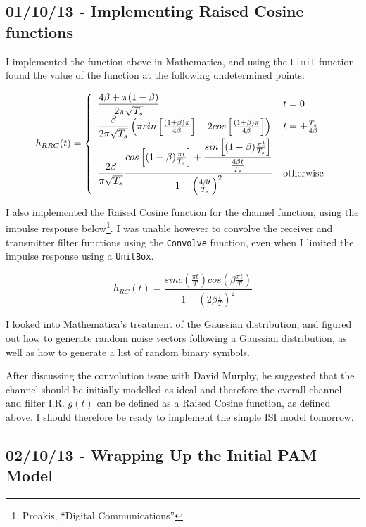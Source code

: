 \subsection{01/10/13 - Implementing Raised Cosine functions}

I implemented the function above in Mathematica, and using the
\texttt{Limit} function found the value of the function at the following
undetermined points:

\[
h_{RRC}(t) = \left\{
  \begin{array}{l l}
    \dfrac{4 \beta + \pi (1 - \beta)}{2 \pi \sqrt{T_s}} & t = 0 \\
    \dfrac{\beta}{2 \pi \sqrt{T_s}} \left ( \pi sin \left [ \frac{(1 + \beta) \pi}{4 \beta} \right ] - 2 cos \left [ \frac{(1 + \beta) \pi}{4 \beta} \right ] \right ) & t = \pm \frac{T_s}{ 4 \beta } \\
    \dfrac{2 \beta}{\pi \sqrt{T_s}} \dfrac{cos \left [ (1 + \beta) \frac{\pi t}{T_s} \right ] + \dfrac{sin \left [ (1 - \beta) \frac{\pi t}{T_s} \right ]}{\frac{4 \beta t}{T_s}}}{1 - \left ( \frac{4 \beta t}{T_s} \right )^2} & \text{otherwise}
  \end{array}\right.
\]

I also implemented the Raised Cosine function for the channel function,
using the impulse response below\footnote{Proakis, ``Digital
  Communications''}. I was unable however to convolve the receiver and
transmitter filter functions using the \texttt{Convolve} function, even
when I limited the impulse response using a \texttt{UnitBox}.

\[
h_{RC}(t) = \frac{sinc \left ( \frac{\pi t}{T} \right ) cos \left ( \beta \frac{\pi t}{T} \right )}{1 - \left ( 2 \beta \frac{t}{T} \right )^2}
\]

I looked into Mathematica's treatment of the Gaussian distribution, and
figured out how to generate random noise vectors following a Gaussian
distribution, as well as how to generate a list of random binary
symbols.

After discussing the convolution issue with David Murphy, he suggested that the
channel should be initially modelled as ideal and therefore the overall
channel and filter I.R. $g(t)$ can be defined as a Raised Cosine
function, as defined above. I should therefore be ready to implement the
simple ISI model tomorrow.

\subsection{02/10/13 - Wrapping Up the Initial PAM Model}

